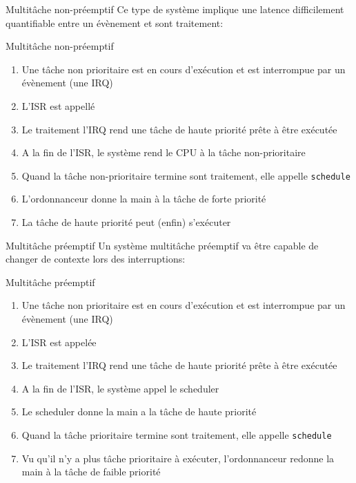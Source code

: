 \begin{frame}{Multitâche non-préemptif}
  Ce type  de système implique une  latence difficilement quantifiable
  entre un évènement et sont traitement:
  \begin{center}
  \end{center}
\end{frame}

\begin{frame}{Multitâche non-préemptif}
  \begin{enumerate}
  \item  Une tâche  non prioritaire  est en  cours d'exécution  et est
    interrompue par un évènement (une IRQ)
  \item L'ISR est appellé
  \item Le traitement  l'IRQ rend une tâche de  haute priorité prête à
    être exécutée
  \item  A  la fin  de  l'ISR,  le système  rend  le  CPU  à la  tâche
    non-prioritaire
  \item Quand  la tâche non-prioritaire termine  sont traitement, elle
    appelle \texttt{schedule}
  \item L'ordonnanceur donne la main à la tâche de forte priorité
  \item La tâche de haute priorité peut (enfin) s'exécuter
  \end{enumerate}
\end{frame}

\begin{frame}{Multitâche préemptif}
  Un  système  multitâche préemptif  va  être  capable  de changer  de
  contexte lors des interruptions:
  \begin{center}
  \end{center}
\end{frame}

\begin{frame}{Multitâche préemptif}
  \begin{enumerate}
  \item  Une tâche  non prioritaire  est en  cours d'exécution  et est
    interrompue par un évènement (une IRQ)
  \item L'ISR est appelée
  \item Le traitement  l'IRQ rend une tâche de  haute priorité prête à
    être exécutée
  \item A la fin de l'ISR, le système appel le scheduler
  \item Le scheduler donne la main a la tâche de haute priorité
  \item  Quand  la tâche  prioritaire  termine  sont traitement,  elle
    appelle \texttt{schedule}
  \item   Vu  qu'il  n'y   a  plus   tâche  prioritaire   à  exécuter,
    l'ordonnanceur redonne la main à la tâche de faible priorité
  \end{enumerate}
\end{frame}

